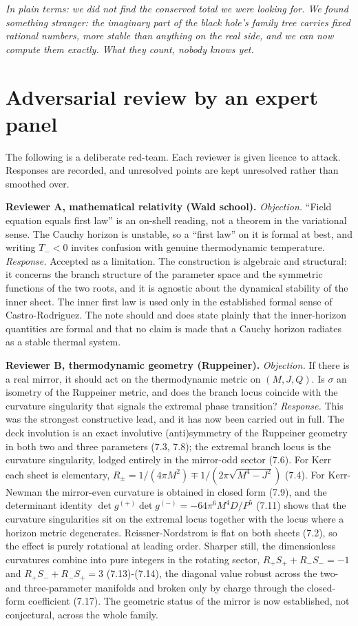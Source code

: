 \documentclass[11pt]{article}
\begin{document}
\emph{In plain terms: we did not find the conserved total we were looking for. We found something stranger: the imaginary part of the black hole's family tree carries fixed rational numbers, more stable than anything on the real side, and we can now compute them exactly. What they count, nobody knows yet.}



\section{Adversarial review by an expert panel}

The following is a deliberate red-team. Each reviewer is given licence to attack. Responses are recorded, and unresolved points are kept unresolved rather than smoothed over.

\textbf{Reviewer A, mathematical relativity (Wald school).}
\emph{Objection.} ``Field equation equals first law'' is an on-shell reading, not a theorem in the variational sense. The Cauchy horizon is unstable, so a ``first law'' on it is formal at best, and writing $T_- < 0$ invites confusion with genuine thermodynamic temperature.
\emph{Response.} Accepted as a limitation. The construction is algebraic and structural: it concerns the branch structure of the parameter space and the symmetric functions of the two roots, and it is agnostic about the dynamical stability of the inner sheet. The inner first law is used only in the established formal sense of Castro-Rodriguez. The note should and does state plainly that the inner-horizon quantities are formal and that no claim is made that a Cauchy horizon radiates as a stable thermal system.

\textbf{Reviewer B, thermodynamic geometry (Ruppeiner).}
\emph{Objection.} If there is a real mirror, it should act on the thermodynamic metric on $(M,J,Q)$. Is $\sigma$ an isometry of the Ruppeiner metric, and does the branch locus coincide with the curvature singularity that signals the extremal phase transition?
\emph{Response.} This was the strongest constructive lead, and it has now been carried out in full. The deck involution is an exact involutive (anti)symmetry of the Ruppeiner geometry in both two and three parameters (7.3, 7.8); the extremal branch locus is the curvature singularity, lodged entirely in the mirror-odd sector (7.6). For Kerr each sheet is elementary, $R_\pm = 1/(4\pi M^2) \mp 1/(2\pi\sqrt{M^4-J^2})$ (7.4). For Kerr-Newman the mirror-even curvature is obtained in closed form (7.9), and the determinant identity $\det g^{(+)}\det g^{(-)} = -64\pi^6 M^4 D/P^5$ (7.11) shows that the curvature singularities sit on the extremal locus together with the locus where a horizon metric degenerates. Reissner-Nordstrom is flat on both sheets (7.2), so the effect is purely rotational at leading order. Sharper still, the dimensionless curvatures combine into pure integers in the rotating sector, $R_+ S_+ + R_- S_- = -1$ and $R_+ S_- + R_- S_+ = 3$ (7.13)-(7.14), the diagonal value robust across the two- and three-parameter manifolds and broken only by charge through the closed-form coefficient (7.17). The geometric status of the mirror is now established, not conjectural, across the whole family.
\end{document}
